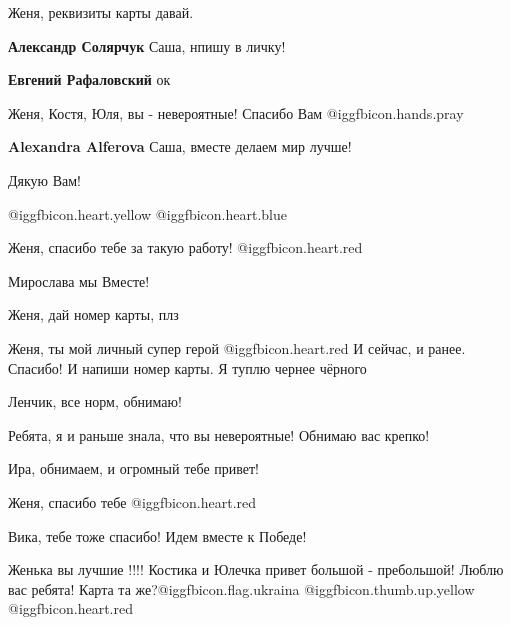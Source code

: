  
 
 
 
 
\zzSecCmt

\begin{itemize} %
Женя, реквизиты карты давай.

\textbf{Александр Солярчук} Саша, нпишу в личку!

\textbf{Евгений Рафаловский} ок

Женя, Костя, Юля, вы - невероятные! Спасибо Вам  @igg{fbicon.hands.pray} 

\textbf{Alexandra Alferova} Саша, вместе делаем мир лучше!

Дякую Вам!

 @igg{fbicon.heart.yellow}  @igg{fbicon.heart.blue} 

Женя, спасибо тебе за такую работу! @igg{fbicon.heart.red}

Мирослава мы Вместе!

Женя, дай номер карты, плз

Женя, ты мой личный супер герой @igg{fbicon.heart.red} И сейчас, и ранее. Спасибо!
И напиши номер карты. Я туплю чернее чёрного

Ленчик, все норм, обнимаю!

Ребята, я и раньше знала, что вы невероятные! Обнимаю вас крепко!

Ира, обнимаем, и огромный тебе привет!

Женя, спасибо тебе @igg{fbicon.heart.red}

Вика, тебе тоже спасибо! Идем вместе к Победе!


Женька вы лучшие
!!!! Костика и Юлечка привет большой - пребольшой!
Люблю вас ребята! Карта та же?@igg{fbicon.flag.ukraina} @igg{fbicon.thumb.up.yellow} @igg{fbicon.heart.red}


\end{itemize}
